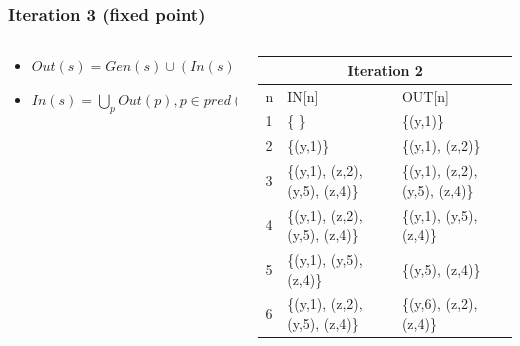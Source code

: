\begin{frame}[fragile, t]
	\frametitle{Iteration 3 (fixed point)} 
	
	\vspace{-1cm}
	
	\begin{columns}[T]
		\begin{column}[T]{.4\textwidth}
			\begin{center}
				\begin{tiny}
					\begin{minipage}{8cm}
							\begin{itemize}
								\item $Out(s) = Gen(s) \cup (In(s) - Kill(s))$  
								\item $In(s) = \bigcup_p Out(p), p \in pred(s), s \in stmts$
							\end{itemize}
					\end{minipage}
				\end{tiny}
			\end{center}
		\end{column}
		\begin{column}[T]{.6\textwidth}
			\begin{tiny}
				\begin{table}[]
					\begin{tabular}{|l|l|l|}
						\hline			
						\multicolumn{3}{|c|}{Iteration 2}\\
						\hline
						n  & IN{[}n{]} & OUT{[}n{]} \\ \hline
						1  & \{ \}                          & \{(y,1)\} \\ \hline
						2  & \{(y,1)\}                      & \{(y,1), (z,2)\} \\ \hline
						3  & \{(y,1), (z,2), (y,5), (z,4)\} & \{(y,1), (z,2), (y,5), (z,4)\} \\ \hline
						4  & \{(y,1), (z,2), (y,5), (z,4)\} & \{(y,1), (y,5), (z,4)\} \\ \hline
						5  & \{(y,1), (y,5), (z,4)\}        & \{(y,5), (z,4)\} \\ \hline
						6  & \{(y,1), (z,2), (y,5), (z,4)\} & \{(y,6), (z,2), (z,4)\} \\ \hline
					\end{tabular}
				\end{table}   
			\end{tiny}
		\end{column}
	\end{columns}
	

\end{frame}
